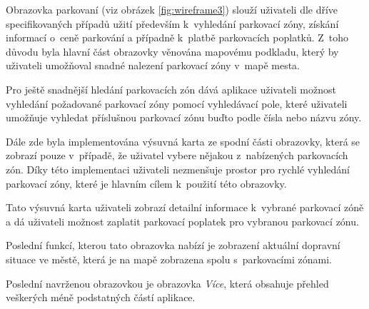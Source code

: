 \begin{minipage}[t]{0.45\textwidth}
Obrazovka parkovaní (viz obrázek \ref{fig:wireframe3}) slouží uživateli dle dříve specifikovaných případů užití především k~vyhledání parkovací zóny, 
získání informací o~ceně parkování a případně k~platbě parkovacích poplatků. Z~toho důvodu byla hlavní část obrazovky věnována mapovému podkladu, 
který by uživateli umožňoval snadné nalezení parkovací zóny v~mapě mesta. %


Pro ještě snadnější hledání parkovacích zón dává aplikace uživateli možnost vyhledání požadované parkovací zóny pomocí vyhledávací pole, které 
uživateli umožňuje vyhledat příslušnou parkovací zónu buďto podle čísla nebo názvu zóny. 

Dále zde byla implementována výsuvná karta ze spodní části obrazovky, která se zobrazí pouze v~případě, že uživatel vybere nějakou
z~nabízených parkovacích zón. Díky této implementaci uživateli nezmenšuje prostor pro rychlé vyhledání parkovací zóny,
které je hlavním cílem k~použití této obrazovky. 

Tato výsuvná karta uživateli zobrazí detailní informace k~vybrané parkovací zóně a dá uživateli možnost zaplatit parkovací poplatek pro vybranou parkovací zónu.

Poslední funkcí, kterou tato obrazovka nabízí je zobrazení aktuální dopravní situace ve městě, která je na mapě zobrazena spolu s~parkovacími zónami.

\bigskip
{}
Poslední navrženou obrazovkou je obrazovka \textit{Více}, která obsahuje přehled veškerých méně podstatných částí aplikace.







\end{minipage}
